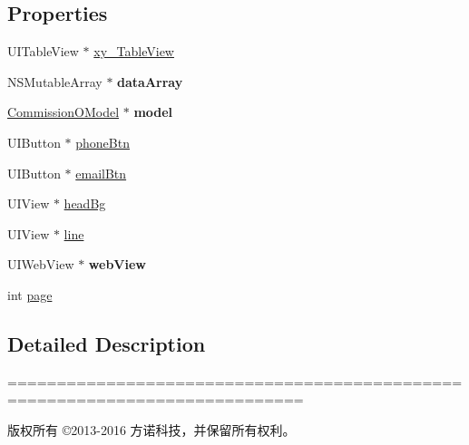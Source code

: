 \subsection*{Properties}
\begin{DoxyCompactItemize}
\item 
U\+I\+Table\+View $\ast$ \mbox{\hyperlink{category_f_x_draw_view_controller_07_08_a2defaa266c7680398b03bc9dd3cbcd86}{xy\+\_\+\+Table\+View}}
\item 
\mbox{\label{category_f_x_draw_view_controller_07_08_aa3b6b7b1ef125add86d02c4b18af6617}} 
N\+S\+Mutable\+Array $\ast$ {\bfseries data\+Array}
\item 
\mbox{\label{category_f_x_draw_view_controller_07_08_ab8f1351c8ab01690305cc5c0d3e5b0fd}} 
\mbox{\hyperlink{interface_commission_o_model}{Commission\+O\+Model}} $\ast$ {\bfseries model}
\item 
U\+I\+Button $\ast$ \mbox{\hyperlink{category_f_x_draw_view_controller_07_08_aa6e8d1f1096a366651a69a5bd60a6b2d}{phone\+Btn}}
\item 
U\+I\+Button $\ast$ \mbox{\hyperlink{category_f_x_draw_view_controller_07_08_acc89b57469bdad6a8c566dd3656ac57d}{email\+Btn}}
\item 
U\+I\+View $\ast$ \mbox{\hyperlink{category_f_x_draw_view_controller_07_08_a4636754e57c56a9a2f0eb6459d2904fc}{head\+Bg}}
\item 
U\+I\+View $\ast$ \mbox{\hyperlink{category_f_x_draw_view_controller_07_08_a36b2036c5e06040be2af61f86b89a816}{line}}
\item 
\mbox{\label{category_f_x_draw_view_controller_07_08_a0888d5ee2f3f0c30f6ec583ff516f13b}} 
U\+I\+Web\+View $\ast$ {\bfseries web\+View}
\item 
int \mbox{\hyperlink{category_f_x_draw_view_controller_07_08_a9eb260208074d950625ac16977aa646f}{page}}
\end{DoxyCompactItemize}


\subsection{Detailed Description}
============================================================================

版权所有 ©2013-\/2016 方诺科技，并保留所有权利。

